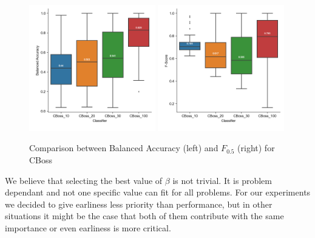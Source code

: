 \begin{figure}[!htbp]
  \captionsetup{justification=raggedright}
  \includegraphics[width=0.49\textwidth,keepaspectratio]{boxplot_accuracy_CBoss.png}
  \includegraphics[width=0.49\textwidth,keepaspectratio]{boxplot_f_score_05_CBoss.png}
  \caption{Comparison between Balanced Accuracy (left) and $F_{0.5}$ (right) for CBoss}
  \label{fig:FBeta1}
\end{figure}

We believe that selecting the best value of $\beta$ is not trivial.
It is problem dependant and not one specific value can fit for all problems.
For our experiments we decided to give earliness less priority than performance,
but in other situations it might be the case that both of them contribute with the same importance or even earliness is more critical.



